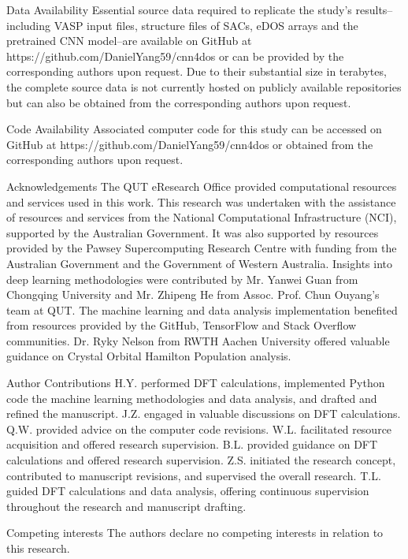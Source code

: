 Data Availability
Essential source data required to replicate the study's results–including VASP input files, structure files of SACs, eDOS arrays and the pretrained CNN model–are available on GitHub at https://github.com/DanielYang59/cnn4dos or can be provided by the corresponding authors upon request. Due to their substantial size in terabytes, the complete source data is not currently hosted on publicly available repositories but can also be obtained from the corresponding authors upon request.


Code Availability
Associated computer code for this study can be accessed on GitHub at https://github.com/DanielYang59/cnn4dos or obtained from the corresponding authors upon request.


Acknowledgements
The QUT eResearch Office provided computational resources and services used in this work. This research was undertaken with the assistance of resources and services from the National Computational Infrastructure (NCI), supported by the Australian Government. It was also supported by resources provided by the Pawsey Supercomputing Research Centre with funding from the Australian Government and the Government of Western Australia. Insights into deep learning methodologies were contributed by Mr. Yanwei Guan from Chongqing University and Mr. Zhipeng He from Assoc. Prof. Chun Ouyang's team at QUT. The machine learning and data analysis implementation benefited from resources provided by the GitHub, TensorFlow and Stack Overflow communities. Dr. Ryky Nelson from RWTH Aachen University offered valuable guidance on Crystal Orbital Hamilton Population analysis.


Author Contributions
H.Y. performed DFT calculations, implemented Python code the machine learning methodologies and data analysis, and drafted and refined the manuscript. J.Z. engaged in valuable discussions on DFT calculations. Q.W. provided advice on the computer code revisions. W.L. facilitated resource acquisition and offered research supervision. B.L. provided guidance on DFT calculations and offered research supervision. Z.S. initiated the research concept, contributed to manuscript revisions, and supervised the overall research. T.L. guided DFT calculations and data analysis, offering continuous supervision throughout the research and manuscript drafting.


Competing interests
The authors declare no competing interests in relation to this research.
